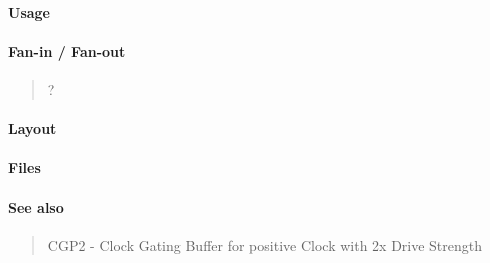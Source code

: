 \paragraph{Usage}

\paragraph{Fan-in / Fan-out}
\begin{quote}
    ?
\end{quote}

\paragraph{Layout}

\paragraph{Files}
%

\paragraph{See also}
\begin{quote}
    CGP2 - Clock Gating Buffer for positive Clock with 2x Drive Strength
\end{quote}
